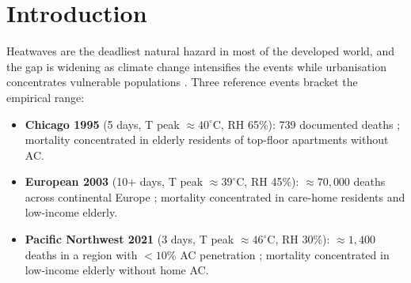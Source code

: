 \documentclass[11pt]{article}
\begin{document}
\begin{abstract}
\noindent We evaluate on three reference heatwaves -- PNW 2021, European 2003, Chicago 1995 -- with a synthetic 1{,}500-household city reflecting documented vulnerability mix.  Headline results: the system reproduces documented mortality concentration (top-25\% of households account for 70--82\% of expected deaths), the hybrid forecaster matches the physics ground truth within $0.5$~$^\circ$C MAE and \emph{beats} the physics-only baseline on the high-humidity Chicago 1995 event ($1.69$ vs $2.07$~$^\circ$C MAE), and the equity-aware allocator achieves $64\%$ of the greedy allocator's raw lives saved while delivering $11\%$ minimum stratum coverage where greedy yields zero.  The full pipeline runs in under three minutes on a single CPU for a 1{,}500-household city.  We discuss honestly where the system does and does not yet earn its keep (Section~\ref{sec:limits}), including the well-known limitation that under perfect physics simulators a pure-physics forecaster matches the ground truth by construction, and outline the path to live deployment with Ecobee-class smart thermostat ingestion.
\end{abstract}

\section{Introduction}

Heatwaves are the deadliest natural hazard in most of the developed world, and the gap is widening as climate change intensifies the events while urbanisation concentrates vulnerable populations \citep{ebi2021climateheath}.  Three reference events bracket the empirical range:

\begin{itemize}[leftmargin=2em]
\item \textbf{Chicago 1995} (5 days, T peak $\approx 40^\circ$C, RH 65\%): 739 documented deaths \citep{semenza1996chicago, kaiser2007chicago}; mortality concentrated in elderly residents of top-floor apartments without AC.
\item \textbf{European 2003} (10+ days, T peak $\approx 39^\circ$C, RH 45\%): $\approx 70{,}000$ deaths across continental Europe \citep{poumadere2005french}; mortality concentrated in care-home residents and low-income elderly.
\item \textbf{Pacific Northwest 2021} (3 days, T peak $\approx 46^\circ$C, RH 30\%): $\approx 1{,}400$ deaths in a region with $<10\%$ AC penetration \citep{philip2021pnw}; mortality concentrated in low-income elderly without home AC.
\end{itemize}
\end{document}
